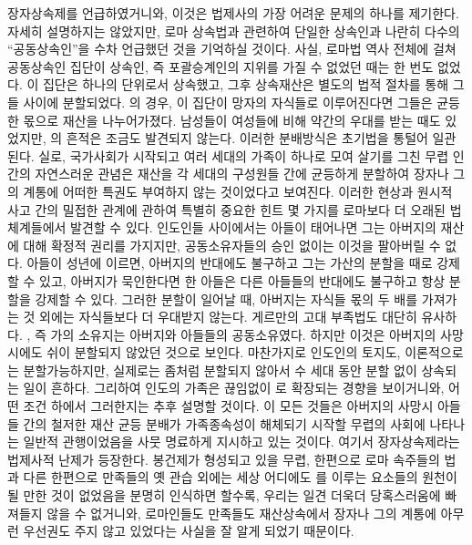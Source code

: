 장자상속제를 언급하였거니와,
이것은 법제사의 가장 어려운 문제의 하나를 제기한다.
자세히 설명하지는 않았지만,
로마 상속법과 관련하여
단일한 상속인과 나란히
다수의 ``공동상속인''을
수차
언급했던 것을 기억하실 것이다.
사실, 로마법 역사 전체에 걸쳐
공동상속인 집단이 상속인, 즉 포괄승계인의 지위를
가질 수 없었던 때는 한 번도 없었다.
이 집단은 하나의 단위로서 상속했고,
그후 상속재산은 별도의 법적 절차를 통해 그들 사이에 분할되었다.
의 경우,
이 집단이 망자의 자식들로 이루어진다면
그들은 균등한 몫으로 재산을 나누어가졌다.
남성들이 여성들에 비해 약간의 우대를 받는 때도 있었지만,
의 흔적은 조금도 발견되지 않는다.
이러한 분배방식은 초기법을 통털어 일관된다.
실로, 국가사회가 시작되고
여러 세대의 가족이 하나로 모여 살기를 그친 무렵
인간의 자연스러운 관념은
재산을 각 세대의 구성원들 간에 균등하게 분할하여
장자나 그의 계통에 어떠한 특권도 부여하지 않는 것이었다고 보여진다.
이러한 현상과
원시적 사고 간의
밀접한 관계에 관하여
특별히 중요한 힌트 몇 가지를
로마보다 더 오래된 법체계들에서 발견할 수 있다.
인도인들 사이에서는 아들이 태어나면
그는 아버지의 재산에 대해 확정적 권리를 가지지만,
공동소유자들의 승인 없이는 이것을 팔아버릴 수 없다.
아들이 성년에 이르면,
아버지의 반대에도 불구하고
그는 가산의 분할을 때로 강제할 수 있고,
아버지가 묵인한다면
한 아들은 다른 아들들의 반대에도 불구하고
항상 분할을 강제할 수 있다.
그러한 분할이 일어날 때,
아버지는
자식들 몫의 두 배를 가져가는 것 외에는
자식들보다 더 우대받지 않는다.
게르만의 고대 부족법도 대단히 유사하다.
, 즉 가의 소유지는
아버지와 아들들의 공동소유였다.
하지만 이것은 아버지의 사망시에도 쉬이 분할되지 않았던 것으로 보인다.
마찬가지로 인도인의 토지도,
이론적으로는 분할가능하지만,
실제로는 좀처럼 분할되지 않아서
수 세대 동안 분할 없이 상속되는 일이 흔하다.
그리하여
인도의 가족은 끊임없이 로
확장되는 경향을 보이거니와,
어떤 조건 하에서 그러한지는
추후 설명할 것이다.
이 모든 것들은
아버지의 사망시 아들들 간의 철저한 재산 균등 분배가
가족종속성이 해체되기 시작할 무렵의 사회에 나타나는
일반적 관행이었음을
사뭇 명료하게 지시하고 있는 것이다.
여기서 장자상속제라는 법제사적 난제가 등장한다.
봉건제가 형성되고 있을 무렵,
한편으로 로마 속주들의 법과 다른 한편으로 만족들의 옛 관습 외에는
세상 어디에도 를 이루는 요소들의 원천이 될 만한 것이 없었음을
분명히 인식하면 할수록,
우리는 일견 더욱더 당혹스러움에 빠져들지 않을 수 없거니와,
로마인들도 만족들도 재산상속에서 장자나 그의 계통에
아무런 우선권도 주지 않고 있었다는 사실을 잘 알게 되었기 때문이다.

